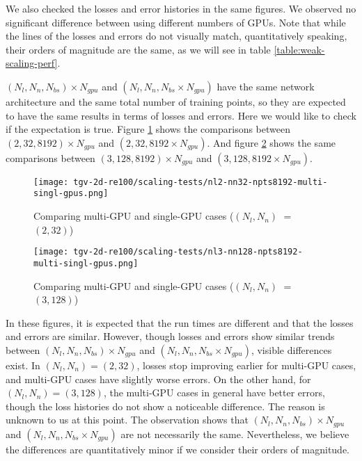We also checked the losses and error histories in the same figures.
We observed no significant difference between using different numbers of GPUs.
Note that while the lines of the losses and errors do not visually match, quantitatively speaking, their orders of magnitude are the same, as we will see in table \ref{table:weak-scaling-perf}. 

$(N_l, N_n, N_{bs})\times N_{gpu}$ and $(N_l, N_n, N_{bs}\times N_{gpu})$ have the same network architecture and the same total number of training points, so they are expected to have the same results in terms of losses and errors.
Here we would like to check if the expectation is true.
Figure \ref{fig:nl2-nn32-npts8192-multi-singl-gpus} shows the comparisons between $(2, 32, 8192)\times N_{gpu}$ and $(2, 32, 8192\times N_{gpu})$.
And figure \ref{fig:nl3-nn128-npts8192-multi-singl-gpus} shows the same comparisons between $(3, 128, 8192)\times N_{gpu}$ and $(3, 128, 8192\times N_{gpu})$.

\begin{figure}[hbt!]
    \centering%
    \texttt{[image: tgv-2d-re100/scaling-tests/nl2-nn32-npts8192-multi-singl-gpus.png]}
    \caption[%
        Comparing multi-GPU and single-GPU cases ($(N_l, N_n)$ $=$ $(2, 32)$)%
    ]{%
        Comparing multi-GPU and single-GPU cases ($(N_l, N_n)$ $=$ $(2, 32)$)%
    }\label{fig:nl2-nn32-npts8192-multi-singl-gpus}
\end{figure}

\begin{figure}[hbt!]
    \centering%
    \texttt{[image: tgv-2d-re100/scaling-tests/nl3-nn128-npts8192-multi-singl-gpus.png]}
    \caption[%
        Comparing multi-GPU and single-GPU cases ($(N_l, N_n)$ $=$ $(3, 128)$)%
    ]{%
        Comparing multi-GPU and single-GPU cases ($(N_l, N_n)$ $=$ $(3, 128)$)%
    }\label{fig:nl3-nn128-npts8192-multi-singl-gpus}
\end{figure}

In these figures, it is expected that the run times are different and that the losses and errors are similar.
However, though losses and errors show similar trends between $(N_l, N_n, N_{bs})\times N_{gpu}$ and $(N_l, N_n, N_{bs}\times N_{gpu})$, visible differences exist.
In $(N_l, N_n)=(2, 32)$, losses stop improving earlier for multi-GPU cases, and multi-GPU cases have slightly worse errors.
On the other hand, for $(N_l, N_n)=(3, 128)$, the multi-GPU cases in general have better errors, though the loss histories do not show a noticeable difference.
The reason is unknown to us at this point.
The observation shows that $(N_l, N_n, N_{bs})\times N_{gpu}$ and $(N_l, N_n, N_{bs}\times N_{gpu})$ are not necessarily the same.
Nevertheless, we believe the differences are quantitatively minor if we consider their orders of magnitude.

